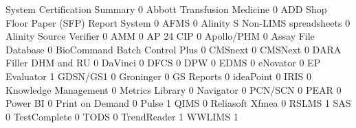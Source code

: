 \documentclass{article}
\begin{document}
\begin{Schunk}
\begin{Soutput}
                                           System Certification Summary
                                                                      0
  Abbott Transfusion Medicine                                         0
  ADD Shop Floor Paper (SFP) Report System                            0
  AFMS                                                                0
  Alinity S Non-LIMS spreadsheets                                     0
  Alinity Source Verifier                                             0
  AMM                                                                 0
  AP 24 CIP                                                           0
  Apollo/PHM                                                          0
  Assay File Database                                                 0
  BioCommand Batch Control Plus                                       0
  CMSnext                                                             0
  CMSNext                                                             0
  DARA Filler DHM and RU                                              0
  DaVinci                                                             0
  DFCS                                                                0
  DPW                                                                 0
  EDMS                                                                0
  eNovator                                                            0
  EP Evaluator                                                        1
  GDSN/GS1                                                            0
  Groninger                                                           0
  GS Reports                                                          0
  ideaPoint                                                           0
  IRIS                                                                0
  Knowledge Management                                                0
  Metrics Library                                                     0
  Navigator                                                           0
  PCN/SCN                                                             0
  PEAR                                                                0
  Power BI                                                            0
  Print on Demand                                                     0
  Pulse                                                               1
  QIMS                                                                0
  Reliasoft Xfmea                                                     0
  RSLMS                                                               1
  SAS                                                                 0
  TestComplete                                                        0
  TODS                                                                0
  TrendReader                                                         1
  WWLIMS                                                              1
                                          

\end{Soutput}
\end{Schunk}
\end{document}
